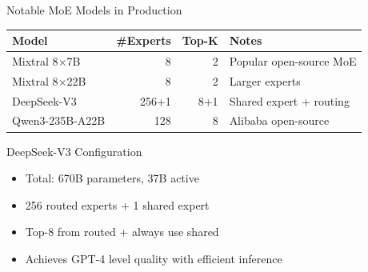\documentclass[aspectratio=169,10pt]{beamer}
\begin{document}
\begin{frame}{Notable MoE Models in Production}
    \begin{table}
        \centering
        \small
        \begin{tabular}{lrrl}
            \toprule
            \textbf{Model} & \textbf{\#Experts} & \textbf{Top-K} & \textbf{Notes} \\
            \midrule
            Mixtral 8$\times$7B & 8 & 2 & Popular open-source MoE \\
            Mixtral 8$\times$22B & 8 & 2 & Larger experts \\
            DeepSeek-V3 & 256+1 & 8+1 & Shared expert + routing \\
            Qwen3-235B-A22B & 128 & 8 & Alibaba open-source \\
            \bottomrule
        \end{tabular}
    \end{table}

    \vspace{0.5cm}
    \begin{block}{DeepSeek-V3 Configuration}
        \begin{itemize}
            \item Total: 670B parameters, 37B active
            \item 256 routed experts + 1 shared expert
            \item Top-8 from routed + always use shared
            \item Achieves GPT-4 level quality with efficient inference
        \end{itemize}
    \end{block}

    \vspace{0.3cm}

\end{frame}
\end{document}
